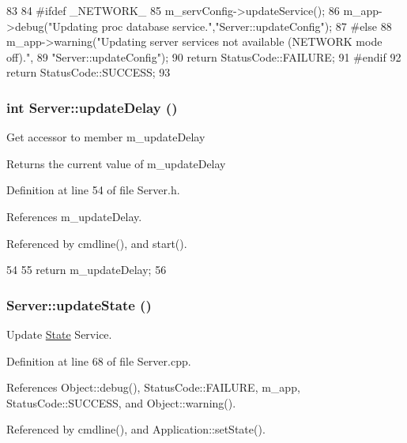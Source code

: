 \begin{DoxyCode}
83                                   {
84 #ifdef _NETWORK_
85   m_servConfig->updateService();
86   m_app->debug("Updating proc database service.","Server::updateConfig");
87 #else
88   m_app->warning("Updating server services not available (NETWORK mode off).",
89                  "Server::updateConfig"); 
90   return StatusCode::FAILURE;
91 #endif
92   return StatusCode::SUCCESS;
93 }
\end{DoxyCode}
\hypertarget{classServer_ac3b91a1bf06dab7911e6d1b867d677bc}{
\subsubsection[{updateDelay}]{\setlength{\rightskip}{0pt plus 5cm}int Server::updateDelay ()}}
\label{classServer_ac3b91a1bf06dab7911e6d1b867d677bc}
Get accessor to member m\_\-updateDelay \begin{DoxyReturn}{Returns}
the current value of m\_\-updateDelay 
\end{DoxyReturn}


Definition at line 54 of file Server.h.

References m\_\-updateDelay.

Referenced by cmdline(), and start().


\begin{DoxyCode}
54                      {
55     return m_updateDelay;
56   }
\end{DoxyCode}
\hypertarget{classServer_abaa0b878f4f96454339f1989ec12cc6b}{
\subsubsection[{updateState}]{ Server::updateState ()}}
\label{classServer_abaa0b878f4f96454339f1989ec12cc6b}


Update \hyperlink{classState}{State} Service. 

Definition at line 68 of file Server.cpp.

References Object::debug(), StatusCode::FAILURE, m\_\-app, StatusCode::SUCCESS, and Object::warning().

Referenced by cmdline(), and Application::setState().



